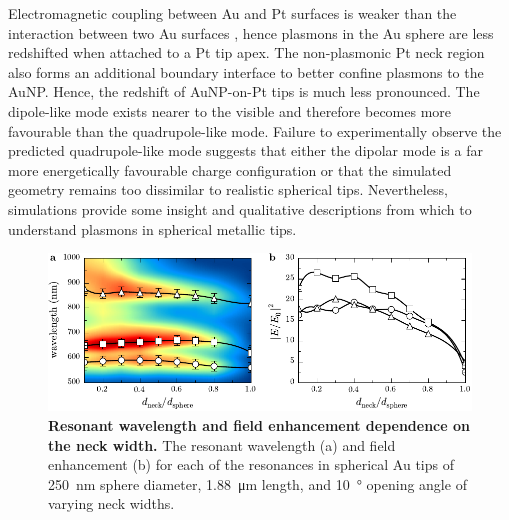 \documentclass{article}
\begin{document}
Electromagnetic coupling between Au and Pt surfaces is weaker than the interaction between two Au surfaces \cite{ren2004}, hence plasmons in the Au sphere are less redshifted when attached to a Pt tip apex. The non-plasmonic Pt neck region also forms an additional boundary interface to better confine plasmons to the AuNP. Hence, the redshift of AuNP-on-Pt tips is much less pronounced. The dipole-like mode exists nearer to the visible and therefore becomes more favourable than the quadrupole-like mode. Failure to experimentally observe the predicted quadrupole-like mode suggests that either the dipolar mode is a far more energetically favourable charge configuration or that the simulated geometry remains too dissimilar to realistic spherical tips. Nevertheless, simulations provide some insight and qualitative descriptions from which to understand plasmons in spherical metallic tips.

\begin{figure}[bt]
\centering
\includegraphics{figures/neck_size_dependence}
\caption[Resonant wavelength and field enhancement dependence on the neck width]{\textbf{Resonant wavelength and field enhancement dependence on the neck width.} The resonant wavelength (a) and field enhancement (b) for each of the resonances in spherical Au tips of \SI{250}{nm} sphere diameter, \SI{1.88}{\micro\metre} length, and \SI{10}{\degree} opening angle of varying neck widths.}
\label{fig:neck_size_dependence}
\end{figure}
\end{document}
